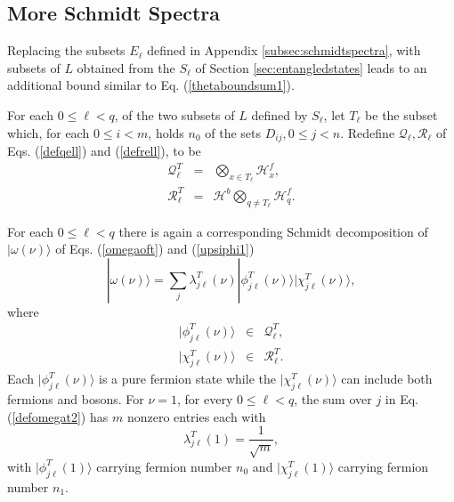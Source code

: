 \documentclass[12pt,amsmath,amssymb,onecolumn]{revtex4-2}
\begin{document}
\subsection{\label{subsec:schmidtspectra2} More Schmidt Spectra}

Replacing the subsets $E_\ell$ defined in Appendix \ref{subsec:schmidtspectra},
with subsets of $L$ obtained from the $S_\ell$ of Section \ref{sec:entangledstates} leads to an
additional bound similar to Eq. (\ref{thetaboundsum1}).

For each $0 \le \ell < q$, of the two subsets of $L$ defined by $S_\ell$, let $T_\ell$ be
the subset which, for each $0 \le i < m$, holds $n_0$ of the sets $D_{ij}, 0 \le j < n$.
Redefine $\mathcal{Q}_\ell, \mathcal{R}_\ell$ of Eqs. (\ref{defqell}) and (\ref{defrell}), to be
\begin{subequations}
\begin{eqnarray}
\label{defqell2}
\mathcal{Q}^T_\ell &=& \bigotimes_{x \in T_\ell} \mathcal{H}_x^f, \\
\label{defrell2}
\mathcal{R}^T_\ell &=& \mathcal{H}^b\bigotimes_{q \ne T_\ell} \mathcal{H}_q^f.
\end{eqnarray}
\end{subequations}

For each $0 \le \ell < q$ there is again a corresponding Schmidt
decomposition of $|\omega(\nu) \rangle $ of Eqs. (\ref{omegaoft}) and (\ref{upsiphi1})
\begin{equation}
\label{defomegat2}
|\omega(\nu) \rangle  =  \sum_j \lambda^T_{j\ell}(\nu) 
|\phi^T_{j\ell}(\nu) \rangle |\chi^T_{j\ell}(\nu) \rangle ,
\end{equation}
where 
\begin{subequations}
\begin{eqnarray}
\label{defphit1}
|\phi^T_{j\ell}(\nu) \rangle  & \in & \mathcal{Q}^T_\ell, \\
\label{defchit1}
|\chi^T_{j\ell}( \nu) \rangle  & \in & \mathcal{R}^T_\ell.
\end{eqnarray}
\end{subequations}
Each $|\phi^T_{j\ell}(\nu) \rangle $ is a pure fermion state while
the $|\chi^T_{j\ell}(\nu) \rangle $ can include both fermions and bosons.
For $\nu = 1$, for every $0 \le \ell < q$,  the sum over $j$ in Eq. (\ref{defomegat2})
has $m$ nonzero entries each with
\begin{equation}
  \label{lambda2}
  \lambda^T_{j \ell}(1) = \frac{1}{\sqrt{m}},
\end{equation}
with $|\phi^T_{j\ell}(1) \rangle $ carrying fermion number $n_0$ and 
$|\chi^T_{j\ell}(1) \rangle $ carrying fermion number $n_1$.
\end{document}

